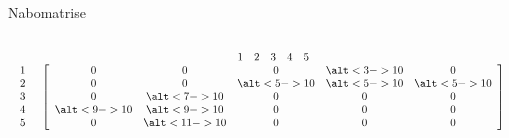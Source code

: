 \documentclass[14pt]{beamer}
\begin{document}
\begin{frame}{Nabomatrise}
\begin{columns}
            \begin{math}
                \begin{array}{c c} &
                \begin{array}{c c c c c} 1 & 2 & 3 & 4 & 5 \\
                \end{array}
                \\
                \begin{array}{c c c c c}
                1 \\ 2 \\ 3 \\ 4 \\ 5
                \end{array}
                &
                \left[
                \begin{array}{c c c c c}
                0 & 0 & 0 & \alt<3->{1}{0} & 0 \\
                0 & 0 & \alt<5->{1}{0} & \alt<5->{1}{0} & \alt<5->{1}{0} \\
                0 & \alt<7->{1}{0} & 0 & 0 & 0 \\
                \alt<9->{1}{0} & \alt<9->{1}{0} & 0 & 0 & 0 \\
                0 & \alt<11->{1}{0} & 0 & 0 & 0 \\
                \end{array}
                \right]
                \end{array}
            \end{math}
    \end{columns}
\end{frame}
\end{document}
